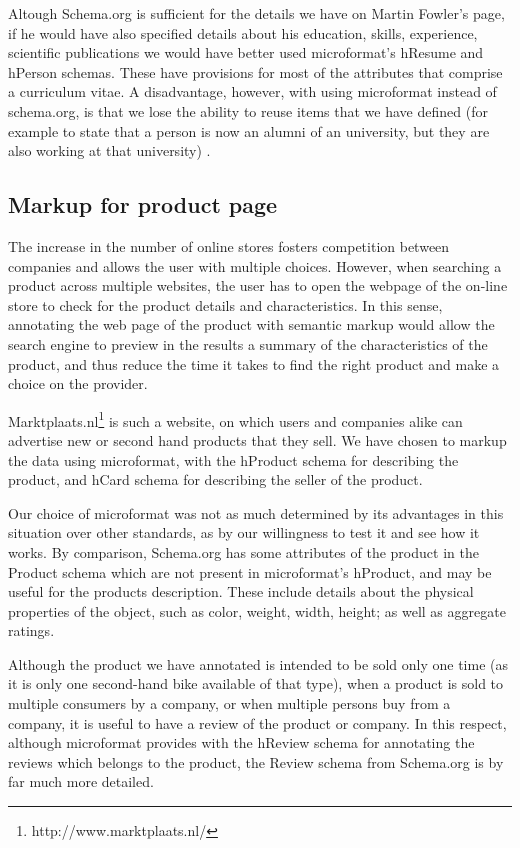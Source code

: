 \documentclass{acm_proc_10ptArticle-sp}
\begin{document}
Altough Schema.org is sufficient for the details we have on Martin Fowler's page, if he would have also specified details about his education, skills, experience, scientific publications we would have better used microformat's hResume and hPerson schemas. These have provisions for most of the attributes that comprise a curriculum vitae. A disadvantage, however, with using microformat instead of schema.org, is that we lose the ability to reuse items that we have defined (for example to state that a person is now an alumni of an university, but they are also working at that university) .

\subsection{Markup for product page}

The increase in the number of online stores fosters competition between companies and allows the user with multiple choices. However, when searching a product across multiple websites, the user has to open the webpage of the on-line store to check for the product details and characteristics. In this sense, annotating the web page of the product with semantic markup would allow the search engine to preview in the results a summary of the characteristics of the product, and thus reduce the time it takes to find the right product and make a choice on the provider. 

Marktplaats.nl\footnote{http://www.marktplaats.nl/} is such a website, on which users and companies alike can advertise new or second hand products that they sell. We have chosen to markup the data using microformat, with the hProduct schema for describing the product, and hCard schema for describing the seller of the product. 

Our choice of microformat was not as much determined by its advantages in this situation over other standards, as by our willingness to test it and see how it works. By comparison, Schema.org has some attributes of the product in the Product schema which are not present in microformat's hProduct, and may be useful for the products description. These include details about the physical properties of the object, such as color, weight, width, height; as well as aggregate ratings.  

Although the product we have annotated is intended to be sold only one time (as it is only one second-hand bike available of that type), when a product is sold to multiple consumers by a company, or when multiple persons buy from a company, it is useful to have a review of the product or company. In this respect, although microformat provides with the hReview schema for annotating the reviews which belongs to the product, the Review schema from Schema.org is by far much more detailed. 
\end{document}
